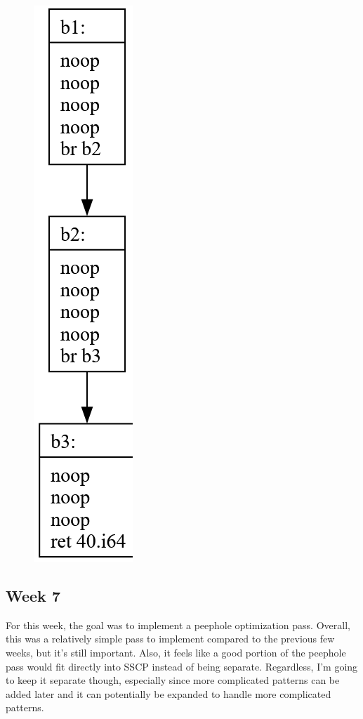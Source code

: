 \documentclass[11pt, a4paper, titlepage]{article}
\begin{document}
\begin{figure}[H]
  \centering
  \includegraphics[scale=0.3]{images/i20.png}
\end{figure}

\subsection{Week 7}

For this week, the goal was to implement a peephole optimization pass. Overall, this was a relatively simple pass to implement compared to the previous few weeks, but it's still important. Also, it feels like a good portion of the peephole pass would fit directly into SSCP instead of being separate. Regardless, I'm going to keep it separate though, especially since more complicated patterns can be added later and it can potentially be expanded to handle more complicated patterns.
\end{document}
